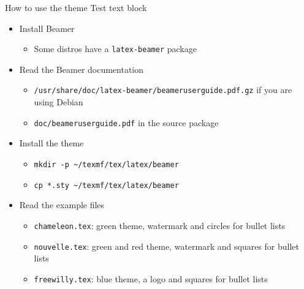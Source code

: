 \begin{frame}[t,fragile]{How to use the theme}
Test text block
\begin{itemize}
\item Install Beamer
  \begin{itemize}
  \item Some distros have a \verb!latex-beamer! package
  \end{itemize}
\item Read the Beamer documentation
  \begin{itemize}
  \item \verb!/usr/share/doc/latex-beamer/beameruserguide.pdf.gz! if you are
        using Debian
  \item \verb!doc/beameruserguide.pdf! in the source package
  \end{itemize}
\item Install the theme
  \begin{itemize}
  \item \verb!mkdir -p ~/texmf/tex/latex/beamer!\\
  \item \verb!cp *.sty ~/texmf/tex/latex/beamer!
  \end{itemize}
\item Read the example files
  \begin{itemize}
  \item \verb!chameleon.tex!: green theme, watermark and circles for bullet
        lists
  \item \verb!nouvelle.tex!: green and red theme, watermark and squares for
        bullet lists
  \item \verb!freewilly.tex!: blue theme, a logo and squares for bullet lists
  \end{itemize}
\end{itemize}
\end{frame}

